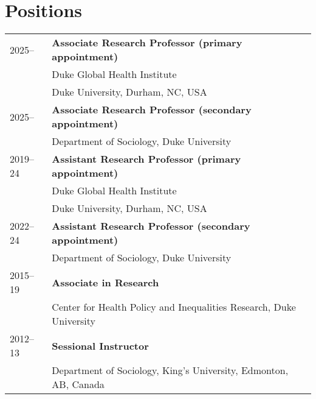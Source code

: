 \vspace{2ex}
\section*{Positions}
\begin{longtable}{p{} p{}}
2025-- & \textbf{Associate Research Professor (primary appointment)}\\
				& Duke Global Health Institute\\
				&Duke University, Durham, NC, USA \\
				
2025-- & \textbf{Associate Research Professor (secondary appointment)}\\
				& Department of Sociology, Duke University \\

2019--24 & \textbf{Assistant Research Professor (primary appointment)}\\
		             & Duke Global Health Institute\\
		             &Duke University, Durham, NC, USA \\
		             
		             2022--24 & \textbf{Assistant Research Professor (secondary appointment)}\\
		             & Department of Sociology, Duke University \\
		             
2015--19 & \textbf{Associate in Research}\\
& Center for Health Policy and Inequalities Research, Duke University\\

2012--13 & \textbf{Sessional Instructor}\\
	& Department of Sociology, King's University, Edmonton, AB, Canada\\
\end{longtable}
